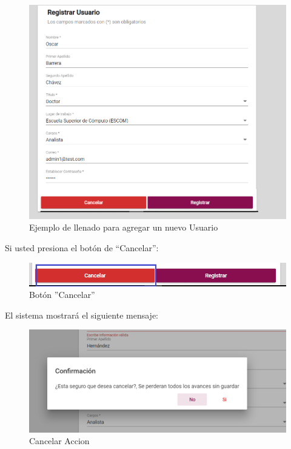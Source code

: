             \begin{figure}[!hbtp]
                \centering
                \hypertarget{ejreg}{\includegraphics[width=0.7\linewidth]{images/SP5/Registro-Usuario-UA}}
                \caption{Ejemplo de llenado para agregar un nuevo Usuario}
                \label{ejreg}
            \end{figure}
    
    \newpage
            Si usted presiona el botón de “Cancelar”: 
            
            \begin{figure}[!hbtp]
                \centering
                \hypertarget{cancel1}{\includegraphics[width=0.7\linewidth]{images/SP5/BtnCancelar1}}
                \caption{Botón ''Cancelar''}
                \label{cancel1}
            \end{figure}
            
            El sistema mostrará el siguiente mensaje:

            
             \begin{figure}[!hbtp]
            	\centering
            \includegraphics[width=0.4\linewidth]{images/SP5/MSG29}
            	\caption{Cancelar Accion}
            	\label{mensaje29}
            \end{figure}    
        
